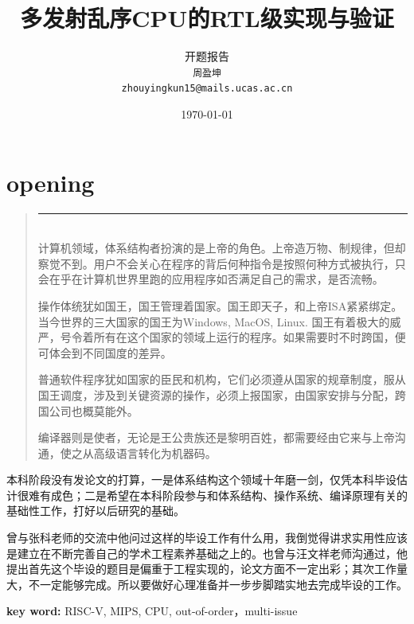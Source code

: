 \documentclass[twocolumn,10pt]{article}
\title{多发射乱序CPU的RTL级实现与验证}
\author{ 开题报告\\
{\tt 周盈坤} \\
{\tt  zhouyingkun15@mails.ucas.ac.cn}
}
\date{\today}
\newenvironment{commentary}
{ \vspace{-0.1in}
  \begin{quotation}
  \noindent
  \small \em
  \rule{\linewidth}{1pt}\\
}
{
  \end{quotation}
}
\begin{document}
\maketitle{}


\section{opening}
\begin{commentary}
	计算机领域，体系结构者扮演的是上帝的角色。上帝造万物、制规律，但却察觉不到。用户不会关心在程序的背后何种指令是按照何种方式被执行，只会在乎在计算机世界里跑的应用程序如否满足自己的需求，是否流畅。
	
	操作体统犹如国王，国王管理着国家。国王即天子，和上帝ISA紧紧绑定。当今世界的三大国家的国王为Windows, MacOS, Linux. 国王有着极大的威严，号令着所有在这个国家的领域上运行的程序。如果需要时不时跨国，便可体会到不同国度的差异。
	
	普通软件程序犹如国家的臣民和机构，它们必须遵从国家的规章制度，服从国王调度，涉及到关键资源的操作，必须上报国家，由国家安排与分配，跨国公司也概莫能外。
	
	编译器则是使者，无论是王公贵族还是黎明百姓，都需要经由它来与上帝沟通，使之从高级语言转化为机器码。
\end{commentary}
本科阶段没有发论文的打算，一是体系结构这个领域十年磨一剑，仅凭本科毕设估计很难有成色；二是希望在本科阶段参与和体系结构、操作系统、编译原理有关的基础性工作，打好以后研究的基础。

曾与张科老师的交流中他问过这样的毕设工作有什么用，我倒觉得讲求实用性应该是建立在不断完善自己的学术工程素养基础之上的。也曾与汪文祥老师沟通过，他提出首先这个毕设的题目是偏重于工程实现的，论文方面不一定出彩；其次工作量大，不一定能够完成。所以要做好心理准备并一步步脚踏实地去完成毕设的工作。

\textbf{key word: }RISC-V, MIPS, CPU, out-of-order，multi-issue
\end{document}
